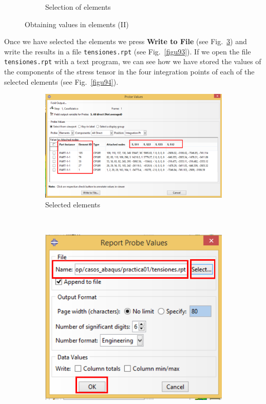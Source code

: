 \begin{enumerate}
\begin{figure}[H]
\begin{subfigure}{0.49\textwidth}
     \caption{Selection of elements}
     \label{figu91}
   \end{subfigure}%
   \caption{Obtaining values in elements (II)}
 \end{figure}

 Once we have selected the elements we press \textbf{Write to File}
 (see Fig.~\ref{figu92}) and write the results in a file
 \texttt{tensiones.rpt} (see Fig.~\ref{figu93}). If we open the file
 \texttt{tensiones.rpt} with a text program, we can see how we have
 stored the values of the components of the stress tensor in the four
 integration points of each of the selected elements (see
 Fig.~\ref{figu94}).


 \begin{figure}[H]
   \centering
   \begin{subfigure}{0.32\textwidth}
     \includegraphics[width=\textwidth]{./body/images/imagen92.pdf}
     \caption{Selected elements}
     \label{figu92}
   \end{subfigure}%
   ~ %
   \begin{subfigure}{0.32\textwidth}
     \includegraphics[width=\textwidth]{./body/images/imagen93.pdf}

\end{subfigure}
\end{figure}
\end{enumerate}
